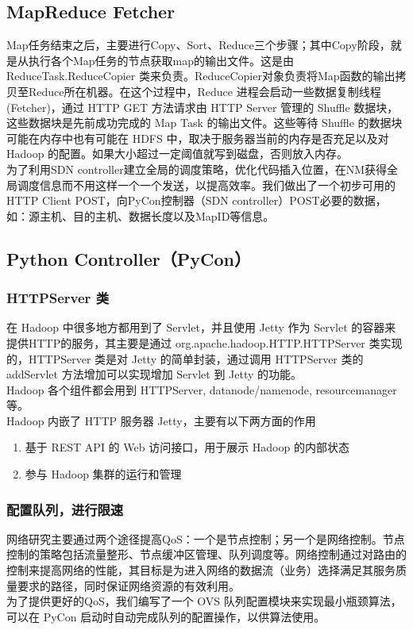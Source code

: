 \documentclass[a4paper, 11pt]{article}                                                   %
\begin{document}
\begin{CJK*}{UTF8}{song}
\subsection{MapReduce Fetcher}

Map任务结束之后，主要进行Copy、Sort、Reduce三个步骤；其中Copy阶段，就是从执行各个Map任务的节点获取map的输出文件。这是由ReduceTask.ReduceCopier 类来负责。ReduceCopier对象负责将Map函数的输出拷贝至Reduce所在机器。在这个过程中，Reduce 进程会启动一些数据复制线程 (Fetcher)，通过 HTTP GET 方法请求由 HTTP Server 管理的 Shuffle 数据块，这些数据块是先前成功完成的 Map Task 的输出文件。这些等待 Shuffle 的数据块可能在内存中也有可能在 HDFS 中，取决于服务器当前的内存是否充足以及对 Hadoop 的配置。如果大小超过一定阈值就写到磁盘，否则放入内存。\\
为了利用SDN controller建立全局的调度策略，优化代码插入位置，在NM获得全局调度信息而不用这样一个一个发送，以提高效率。我们做出了一个初步可用的 HTTP Client POST，向PyCon控制器（SDN controller）POST必要的数据，如：源主机、目的主机、数据长度以及MapID等信息。

\subsection{Python Controller（PyCon）}
\subsubsection{HTTPServer 类}

在 Hadoop 中很多地方都用到了 Servlet，并且使用 Jetty 作为 Servlet 的容器来提供HTTP的服务，其主要是通过 org.apache.hadoop.HTTP.HTTPServer 类实现的，HTTPServer 类是对 Jetty 的简单封装，通过调用 HTTPServer 类的 addServlet 方法增加可以实现增加 Servlet 到 Jetty 的功能。\\
 Hadoop 各个组件都会用到 HTTPServer, datanode/namenode, resourcemanager等。\\
Hadoop 内嵌了 HTTP 服务器 Jetty，主要有以下两方面的作用
\begin{enumerate}
  \item 基于 REST API 的 Web 访问接口，用于展示 Hadoop 的内部状态
  \item 参与 Hadoop 集群的运行和管理
\end{enumerate}

\subsubsection{配置队列，进行限速}
网络研究主要通过两个途径提高QoS：一个是节点控制；另一个是网络控制。节点控制的策略包括流量整形、节点缓冲区管理、队列调度等。网络控制通过对路由的控制来提高网络的性能，其目标是为进入网络的数据流（业务）选择满足其服务质量要求的路径，同时保证网络资源的有效利用。\\
为了提供更好的QoS，我们编写了一个 OVS 队列配置模块来实现最小瓶颈算法，可以在 PyCon 启动时自动完成队列的配置操作，以供算法使用。


\end{CJK*}
\end{document}
